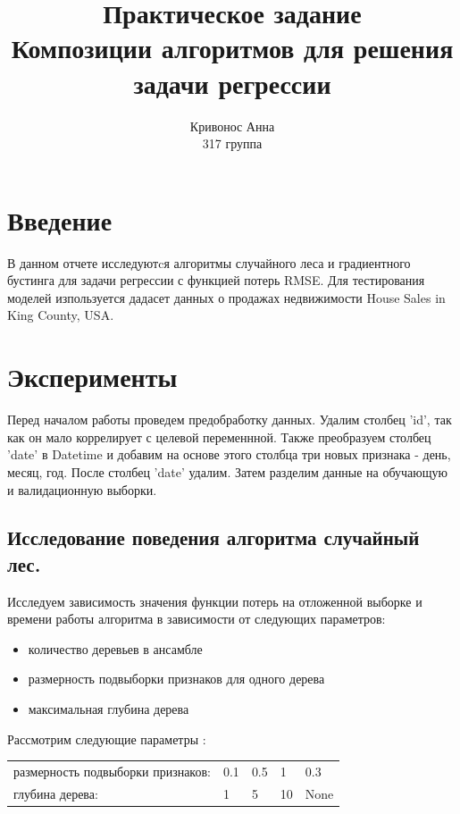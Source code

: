 \documentclass[a4paper, 12pt]{report}
\author{Кривонос Анна \\ 317 группа}
\title{Практическое задание \\ Композиции алгоритмов для решения задачи регрессии }
\begin{document}
\maketitle

\tableofcontents{}
\clearpage

\chapter{Введение}
В данном отчете исследуютcя алгоритмы случайного леса и градиентного бустинга для задачи регрессии с функцией потерь RMSE.
Для тестирования моделей изпользуется дадасет данных о продажах недвижимости House Sales in King County, USA.



\chapter{Эксперименты}
Перед началом работы проведем предобработку данных. Удалим столбец 'id', так как он мало коррелирует с целевой переменнной. Также преобразуем столбец 'date' в Datetime и добавим на основе этого столбца три новых признака - день, месяц, год. После столбец 'date'
удалим. Затем разделим данные на обучающую и валидационную выборки.


\section{Исследование поведения алгоритма случайный лес.}  


Исследуем зависимость значения функции потерь на отложенной выборке и  времени работы алгоритма в зависимости от следующих параметров:
\begin{itemize}
        \item количество деревьев в ансамбле 
        \item размерность подвыборки признаков для одного дерева
        \item максимальная глубина дерева
\end{itemize}


Рассмотрим следующие параметры :
\begin{table}[H]
\begin{tabular}{lllll}
размерность подвыборки признаков: & 0.1 & 0.5 & 1 & 0.3  \\
глубина дерева:  & 1 & 5 & 10 & None  \\
\end{tabular}
\end{table}
\end{document}
